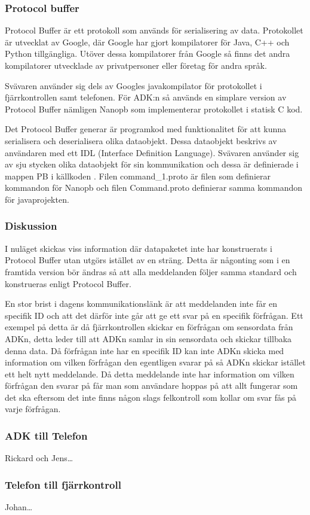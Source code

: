 \subsubsection{Protocol buffer}
\label{subsubsec: Protocol buffer}
Protocol Buffer\cite{Protocol buffer} är ett protokoll som används för
serialisering av data.
Protokollet är utvecklat av Google, där Google har gjort kompilatorer för Java,
C++ och Python tillgängliga. Utöver dessa kompilatorer från Google så finns det
andra kompilatorer utvecklade av privatpersoner eller företag för andra språk.

Svävaren använder sig dels av Googles javakompilator för protokollet i 
fjärrkontrollen samt telefonen. För ADK:n så används en simplare version av
Protocol Buffer nämligen Nanopb \cite{Nanopb} som implementerar protokollet i
statisk C kod.

Det Protocol Buffer generar är programkod med funktionalitet för att kunna
serialisera och deserialisera olika dataobjekt. Dessa dataobjekt beskrivs av
användaren med ett IDL (Interface Definition Language).
Svävaren använder sig av sju stycken olika dataobjekt för sin kommunikation och
dessa är definierade i mappen PB i källkoden \cite{Source code}. Filen
command\_1.proto är filen som definierar kommandon för Nanopb och filen
Command.proto definierar samma kommandon för javaprojekten.

\subsubsection{Diskussion}
I nuläget skickas viss information där datapaketet inte har konstruerats i Protocol Buffer utan utgörs istället av 
en sträng. Detta är någonting som i en framtida version bör ändras så att alla meddelanden följer samma standard och 
konstrueras enligt Protocol Buffer. 

En stor brist i dagens kommunikationslänk är att meddelanden inte får en specifik ID och 
att det därför inte går att ge ett svar på en specifik förfrågan. Ett exempel på detta är då fjärrkontrollen skickar en 
förfrågan om sensordata från ADKn, detta leder till att ADKn samlar in sin sensordata och skickar tillbaka denna data. 
Då förfrågan inte har en specifik ID kan inte ADKn skicka med information om vilken förfrågan den egentligen svarar på 
så ADKn skickar istället ett helt nytt meddelande. Då detta meddelande inte har information om vilken förfrågan den svarar 
på får man som användare hoppas på att allt fungerar som det ska eftersom det inte finns någon slags felkontroll som kollar 
om svar fås på varje förfrågan.

\subsubsection{ADK till Telefon}
Rickard och Jens\ldots
\subsubsection{Telefon till fjärrkontroll}
Johan\ldots
